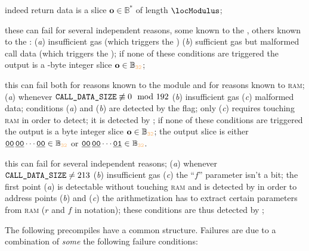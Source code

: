\begin{description}
		indeed return data is a slice $\textbf{o} \in \mathbb{B}^*$ of length $\locModulus$;
	\item[\instEcadd{} and \instEcmul{}:]
		these can fail for several independent reasons, some known to the \hubMod{}, others known to the \mmuMod{}:
		(\emph{a}) insufficient gas (which triggers the \scenPrcFailureKnownToHub{})
		(\emph{b}) sufficient gas but malformed call data (which triggers the \scenPrcFailureKnownToRam{});
		if none of these conditions are triggered the output is a \evmWordSize{}-byte integer slice $\textbf{o} \in \mathbb{B}_{\evmWordSize}$;
	\item[\inst{ECPARIRING}:]
		this can fail both for reasons known to the \hubMod{} module and for reasons known to \textsc{ram};
		(\emph{a}) whenever $\texttt{CALL\_DATA\_SIZE} \not\equiv 0 \mod 192$
		(\emph{b}) insufficient gas
		(\emph{c}) malformed data;
		conditions (\emph{a}) and (\emph{b}) are detected by the \scenPrcFailureKnownToHub{} flag;
		only (\emph{c}) requires touching \textsc{ram} in order to detect;
		it is detected by \scenPrcFailureKnownToRam{};
		if none of these conditions are triggered the output is a \evmWordSize byte integer slice $\textbf{o} \in \mathbb{B}_{\evmWordSize}$;
		the output slice is either
		$
		\utt{00}\,
		\utt{00} \cdots
		\utt{00} \in \mathbb{B}_{\evmWordSize}$
		or
		$
		\utt{00}\,
		\utt{00} \cdots
		\utt{01} \in \mathbb{B}_{\evmWordSize}$.
	\item[\instBlake{}:]
		this can fail for several independent reasons;
		(\emph{a}) whenever $\texttt{CALL\_DATA\_SIZE} \neq 213$
		(\emph{b}) insufficient gas
		(\emph{c}) the ``$f$'' parameter isn't a bit;
		the first point (\emph{a}) is detectable without touching \textsc{ram} and is detected by \scenPrcFailureKnownToHub{} 
		in order to address points (\emph{b}) and (\emph{c}) the arithmetization has to extract certain parameters from \textsc{ram} ($r$ and $f$ in \cite{EYP-London} notation);
		these conditions are thus detected by \scenPrcFailureKnownToRam{};
\end{description}
The following precompiles have a common structure.
Failures are due to a combination of \emph{some} the following failure conditions:
